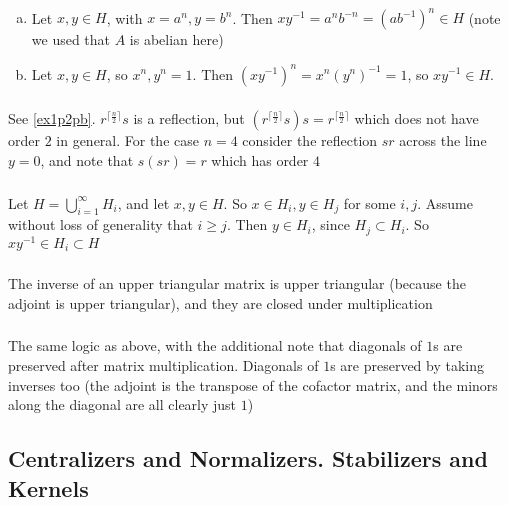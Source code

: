 \documentclass{article}
\newcommand{\inv}[1]{ {#1}^{-1} }
\newcommand{\ceil}[1]{\lceil #1 \rceil}
\begin{document}
\subsubsection{}\label{ex1p12}

\begin{enumerate}[(a)]
\item Let $x,y\in H$, with $x=a^n, y=b^n$. Then $x\inv{y} = a^nb^{-n} = (a\inv{b})^n \in H$ (note we used that $A$ is abelian here)
\item Let $x,y\in H$, so $x^n,y^n=1$. Then $(x\inv{y})^n = x^n\inv{(y^n)} = 1$, so $x\inv{y} \in H$.
\end{enumerate}
\subsubsection{}\label{ex1p13}
\subsubsection{}\label{ex1p14}
\newcommand{\lereflect}{r^{\ceil{\frac{n}{2}}}s}
See \ref{ex1p2pb}. $\lereflect$ is a reflection, but $(\lereflect)s = r^{\ceil{\frac{n}{2}}}$ which does not have order $2$ in general. For the case $n=4$ consider the reflection $sr$ across the line $y=0$, and note that $s(sr) = r$ which has order $4$
\subsubsection{}\label{ex1p15}
Let $H = \bigcup_{i=1}^{\infty}H_i$, and let $x,y\in H$. So $x \in H_i, y\in H_j$ for some $i,j$. Assume without loss of generality that $i \geq j$. Then $y \in H_i$, since $H_j \subset H_i$. So $x\inv{y} \in H_i \subset H$
\subsubsection{}\label{ex1p16} 
The inverse of an upper triangular matrix is upper triangular (because the adjoint is upper triangular), and they are closed under multiplication
\subsubsection{}\label{ex1p17}
The same logic as above, with the additional note that diagonals of $1$s are preserved after matrix multiplication. Diagonals of $1$s are preserved by taking inverses too (the adjoint is the transpose of the cofactor matrix, and the minors along the diagonal are all clearly just $1$)
\subsection{Centralizers and Normalizers. Stabilizers and Kernels}
\end{document}
